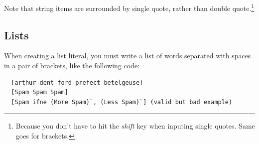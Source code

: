 \documentclass{report}
\begin{document}
Note that string items are surrounded by single quote, rather than double quote.\footnote{Because you don't have to hit the \textit{shift} key when inputing single quotes. Same goes for brackets.}

\subsection{Lists}

When creating a list literal, you must write a list of words separated with spaces in a pair of brackets, like the following code:
\begin{mdframed}[style=example]
\begin{verbatim}
  [arthur-dent ford-prefect betelgeuse]
  [Spam Spam Spam]
  [Spam ifne (More Spam)`, (Less Spam)`] (valid but bad example)
\end{verbatim}
\end{mdframed}
\end{document}
